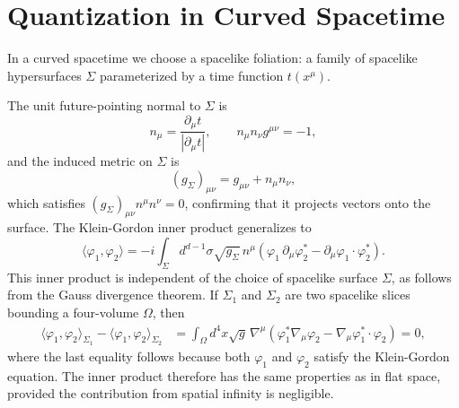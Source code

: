 \section{Quantization in Curved Spacetime}

In a curved spacetime we choose a spacelike foliation: a family of
spacelike hypersurfaces $\Sigma$ parameterized by a time function
$t(x^\mu)$.


The unit future-pointing normal to $\Sigma$ is
\begin{equation}
	n_\mu = \frac{\partial_\mu t}{|\partial_\mu t|},
	\qquad n_\mu n_\nu g^{\mu\nu} = -1,
\end{equation}
and the induced metric on $\Sigma$ is
\begin{equation}
	(g_\Sigma)_{\mu\nu} = g_{\mu\nu} + n_\mu n_\nu,
\end{equation}
which satisfies $(g_\Sigma)_{\mu\nu}n^\mu n^\nu = 0$, confirming that
it projects vectors onto the surface. The Klein-Gordon inner product
generalizes to
\begin{equation}
	\langle\varphi_1,\varphi_2\rangle
	= -i\int_\Sigma d^{d-1}\sigma\sqrt{g_\Sigma}\,n^\mu
	\left(\varphi_1\,\partial_\mu\varphi_2^*
	- \partial_\mu\varphi_1\cdot\varphi_2^*\right).
\end{equation}
This inner product is independent of the choice of spacelike surface
$\Sigma$, as follows from the Gauss divergence theorem. If $\Sigma_1$
and $\Sigma_2$ are two spacelike slices bounding a four-volume
$\Omega$, then
\begin{align}
	\langle\varphi_1,\varphi_2\rangle_{\Sigma_1}
	- \langle\varphi_1,\varphi_2\rangle_{\Sigma_2}
	 & = \int_\Omega d^4x\sqrt{g}\,
	\nabla^\mu\!\left(\varphi_1^*\nabla_\mu\varphi_2
	- \nabla_\mu\varphi_1^*\cdot\varphi_2\right) = 0,
\end{align}
where the last equality follows because both $\varphi_1$ and
$\varphi_2$ satisfy the Klein-Gordon equation. The inner product
therefore has the same properties as in flat space, provided the
contribution from spatial infinity is negligible.


